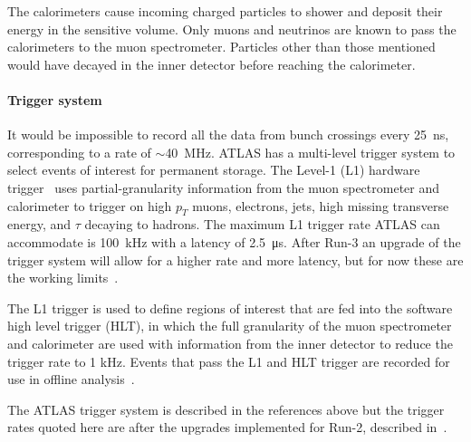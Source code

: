 The calorimeters cause incoming charged particles to shower and deposit their energy in the sensitive volume. Only muons and neutrinos are known to pass the calorimeters to the muon spectrometer.  Particles other than those mentioned would have decayed in the inner detector before reaching the calorimeter. 

\paragraph*{Trigger system} \hfill \break
It would be impossible to record all the data from bunch crossings every \SI{25}{\nano\second}, corresponding to a rate of $\sim$\SI{40}{MHz}. ATLAS has a multi-level trigger system to select events of interest for permanent storage. The Level-1 (L1) hardware trigger~\cite{atlas_l1_trigger_tdr} uses partial-granularity information from the muon spectrometer and calorimeter to trigger on high $p_T$ muons, electrons, jets, high missing transverse energy, and $\tau$ decaying to hadrons. The maximum L1 trigger rate ATLAS can accommodate is \SI{100}{kHz} with a latency of \SI{2.5}{\micro\second}. After Run-3 an upgrade of the trigger system will allow for a higher rate and more latency, but for now these are the working limits~\cite{tdaq_phase2_tdr}.


The L1 trigger is used to define regions of interest that are fed into the software high level trigger (HLT), in which the full granularity of the muon spectrometer and calorimeter are used with information from the inner detector to reduce the trigger rate to 1 kHz. Events that pass the L1 and HLT trigger are recorded for use in offline analysis~\cite{atlas_hlt_trigger_tdr}.

The ATLAS trigger system is described in the references above but the trigger rates quoted here are after the upgrades implemented for Run-2, described in~\cite{martinez_run-2_2016}.

